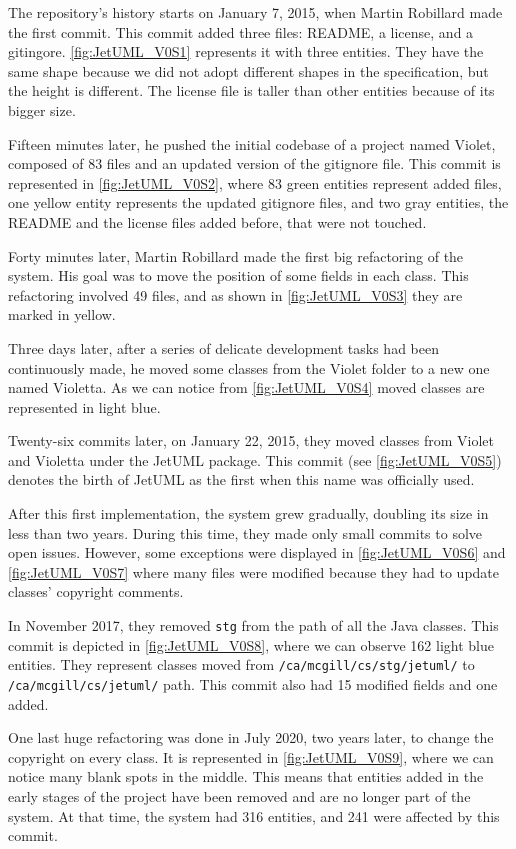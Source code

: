 The repository's history starts on January 7, 2015, when Martin Robillard made the first commit. 
This commit added three files: README, a license, and a gitingore. 
\autoref{fig:JetUML_V0S1} represents it with three entities. They have the same shape because we did not adopt different shapes in the specification, but the height is different. The license file is taller than other entities because of its bigger size. 

Fifteen minutes later, he pushed the initial codebase of a project named Violet, composed of 83 files and an updated version of the gitignore file. This commit is represented in \autoref{fig:JetUML_V0S2}, where 83 green entities represent added files, one yellow entity represents the updated gitignore files, and two gray entities, the README and the license files added before, that were not touched.

Forty minutes later, Martin Robillard made the first big refactoring of the system. His goal was to move the position of some fields in each class. This refactoring involved 49 files, and as shown in \autoref{fig:JetUML_V0S3} they are marked in yellow. 

Three days later, after a series of delicate development tasks had been continuously made, he moved some classes from the Violet folder to a new one named Violetta. As we can notice from \autoref{fig:JetUML_V0S4} moved classes are represented in light blue. 

Twenty-six commits later, on January 22, 2015, they moved classes from Violet and Violetta under the JetUML package. 
This commit (see \autoref{fig:JetUML_V0S5}) denotes the birth of JetUML as the first when this name was officially used.

After this first implementation, the system grew gradually, doubling its size in less than two years. 
During this time, they made only small commits to solve open issues. However, some exceptions were displayed in \autoref{fig:JetUML_V0S6} and \autoref{fig:JetUML_V0S7} where many files were modified because they had to update classes' copyright comments. 

In November 2017, they removed \texttt{stg} from the path of all the Java classes. This commit is depicted in \autoref{fig:JetUML_V0S8}, where we can observe 162 light blue entities. They represent classes moved from \texttt{/ca/mcgill/cs/stg/jetuml/} to \texttt{/ca/mcgill/cs/jetuml/} path. This commit also had 15 modified fields and one added. 

One last huge refactoring was done in July 2020, two years later, to change the copyright on every class. It is represented in \autoref{fig:JetUML_V0S9}, where we can notice many blank spots in the middle. This means that entities added in the early stages of the project have been removed and are no longer part of the system. At that time, the system had 316 entities, and 241 were affected by this commit. 

